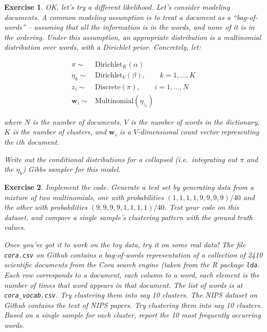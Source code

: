 \documentclass[twoside]{article}
\newcounter{lecnum}
\newtheorem{exercise}{Exercise}[lecnum]
\begin{document}
 \begin{exercise}
   OK, let's try a different likelihood. Let's consider modeling documents. A common modeling assumption is to treat a document as a ``bag-of-words'' -- assuming that all the information is in the words, and none of it is in the ordering. Under this assumption, an appropriate distribution is a multinomial distribution over words, with a Dirichlet prior. Concretely, let:

   $$\begin{aligned}
     \pi \sim& \mbox{Dirichlet}_K(\alpha)\\
     \eta_k \sim& \mbox{Dirichlet}_V(\beta),\qquad k=1,\dots,K\\
     z_i \sim& \mbox{Discrete}(\pi),\qquad i=1,\dots, N\\
     \mathbf{w}_i \sim& \mbox{Multinomial}(\eta_{z_i})
   \end{aligned}$$

   where $N$ is the number of documents, $V$ is the number of words in the dictionary, $K$ is the number of clusters, and $\mathbf{w}_i$ is a $V$-dimensional count vector representing the $i$th document.

   Write out the conditional distributions for a collapsed (i.e.\ integrating out $\pi$ and the $\eta_k$) Gibbs sampler for this model.

 \end{exercise}

 \begin{exercise}
   Implement the code. Generate a test set by generating data from a mixture of two multinomials, one with probabilities $(1,1,1,1,9,9,9,9)/40$ and the other with probabilities $(9,9,9,9,1,1,1,1)/40$. Test your code on this dataset, and compare a single sample's clustering pattern with the ground truth values.


   Once you've got it to work on the toy data, try it on some real data! The file \texttt{cora.csv} on Github contains a bag-of-words representation of a collection of 2410 scientific documents from the Cora search engine (taken from the R package \texttt{lda}. Each row corresponds to a document, each column to a word, each element is the number of times that word appears in that document. The list of words is at \texttt{cora\_vocab.csv}. Try clustering them into say 10 clusters. The NIPS dataset on Github contains the text of NIPS papers. Try clustering them into say 10 clusters. Based on a single sample for each cluster, report the 10 most frequently occurring words.
 

 \end{exercise}
\end{document}
